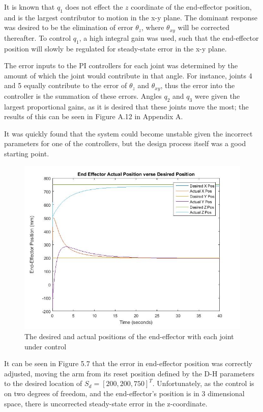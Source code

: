 \documentclass[12pt,openany,a4paper]{book}
\begin{document}
It is known that $q_1$ does not effect the $z$ coordinate of the end-effector position, and is the largest contributor to motion in the x-y plane. The dominant response was desired to be the elimination of error $\theta_z$, where $\theta_{xy}$ will be corrected thereafter. To control $q_1$, a high integral gain was used, such that the end-effector position will slowly be regulated for steady-state error in the x-y plane. 

The error inputs to the PI controllers for each joint was determined by the amount of which the joint would contribute in that angle. For instance, joints 4 and 5 equally contribute to the error of $\theta_z$ and $\theta_{xy}$, thus the error into the controller is the summation of these errors. Angles $q_2$ and $q_3$ were given the largest proportional gains, as it is desired that these joints move the most; the results of this can be seen in Figure A.12 in Appendix A.

It was quickly found that the system could become unstable given the incorrect parameters for one of the controllers, but the design process itself was a good starting point.
\clearpage
\begin{center}
\begin{figure}[htb]
  \includegraphics[width=1\linewidth]{matlab_inv_des_act.jpg}
\caption{The desired and actual positions of the end-effector with each joint under control}
\end{figure}
\end{center}

It can be seen in Figure 5.7 that the error in end-effector position was correctly adjusted, moving the arm from its reset position defined by the D-H parameters to the desired location of $S_d = [200, 200, 750]^T$. Unfortunately, as the control is on two degrees of freedom, and the end-effector's position is in 3 dimensional space, there is uncorrected steady-state error in the z-coordinate.
\end{document}
